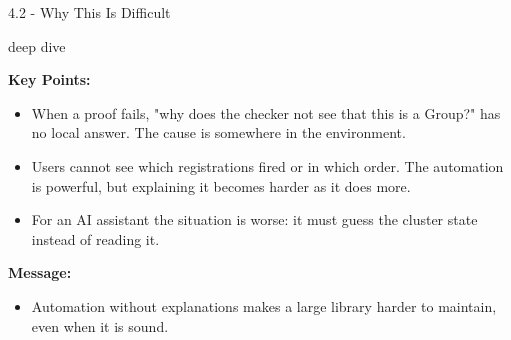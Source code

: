 \documentclass[aspectratio=169,11pt]{beamer}
\newcommand{\deepdivetag}{\hfill\colorbox{black!15}{\textcolor{black!65}{\strut\scriptsize\sffamily deep dive}}}
\begin{document}
\begin{frame}[fragile,t]{4.2 - Why This Is Difficult\deepdivetag}
\smallskip
\textbf{Key Points:}
\begin{itemize}
\setlength{\itemsep}{1pt}
\setlength{\parsep}{0pt}
\setlength{\parskip}{0pt}
\item When a proof fails, "why does the checker not see that this is a Group?" has no local answer. The cause is somewhere in the environment.
\item Users cannot see which registrations fired or in which order. The automation is powerful, but explaining it becomes harder as it does more.
\item For an AI assistant the situation is worse: it must guess the cluster state instead of reading it.
\end{itemize}
\smallskip
\textbf{Message:}
\begin{itemize}
\setlength{\itemsep}{1pt}
\setlength{\parsep}{0pt}
\setlength{\parskip}{0pt}
\item Automation without explanations makes a large library harder to maintain, even when it is sound.
\end{itemize}
\end{frame}
\end{document}
